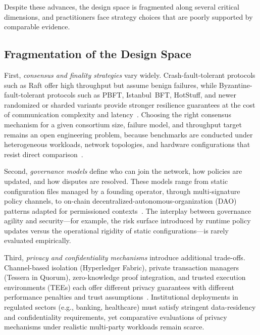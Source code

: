 \documentclass[journal]{IEEEtran}
\begin{document}
Despite these advances, the design space is fragmented along several critical dimensions, and practitioners face strategy choices that are poorly supported by comparable evidence.

\subsection{Fragmentation of the Design Space}

First, \emph{consensus and finality strategies} vary widely.
Crash-fault-tolerant protocols such as Raft offer high throughput but assume benign failures, while Byzantine-fault-tolerant protocols such as PBFT, Istanbul~BFT, HotStuff, and newer randomized or sharded variants provide stronger resilience guarantees at the cost of communication complexity and latency~\cite{ongaro2014raft,castro1999practical,sousa2018byzantine,baudet2019state,miller2016honeybadger,yin2019hotstuff}.
Choosing the right consensus mechanism for a given consortium size, failure model, and throughput target remains an open engineering problem, because benchmarks are conducted under heterogeneous workloads, network topologies, and hardware configurations that resist direct comparison~\cite{dinh2017blockbench,nasir2022performance,wu2023sharding,zhong2023stpbft}.

Second, \emph{governance models} define who can join the network, how policies are updated, and how disputes are resolved.
These models range from static configuration files managed by a founding operator, through multi-signature policy channels, to on-chain decentralized-autonomous-organization (DAO) patterns adapted for permissioned contexts~\cite{beck2018governance,reijers2021governance,zhang2023governance,badi2025governance}.
The interplay between governance agility and security---for example, the risk surface introduced by runtime policy updates versus the operational rigidity of static configurations---is rarely evaluated empirically.

Third, \emph{privacy and confidentiality mechanisms} introduce additional trade-offs.
Channel-based isolation (Hyperledger Fabric), private transaction managers (Tessera in Quorum), zero-knowledge proof integration, and trusted execution environments (TEEs) each offer different privacy guarantees with different performance penalties and trust assumptions~\cite{androulaki2018hyperledger,benhamouda2020can,hu2023zksnarks}.
Institutional deployments in regulated sectors (e.g., banking, healthcare) must satisfy stringent data-residency and confidentiality requirements, yet comparative evaluations of privacy mechanisms under realistic multi-party workloads remain scarce.
\end{document}
